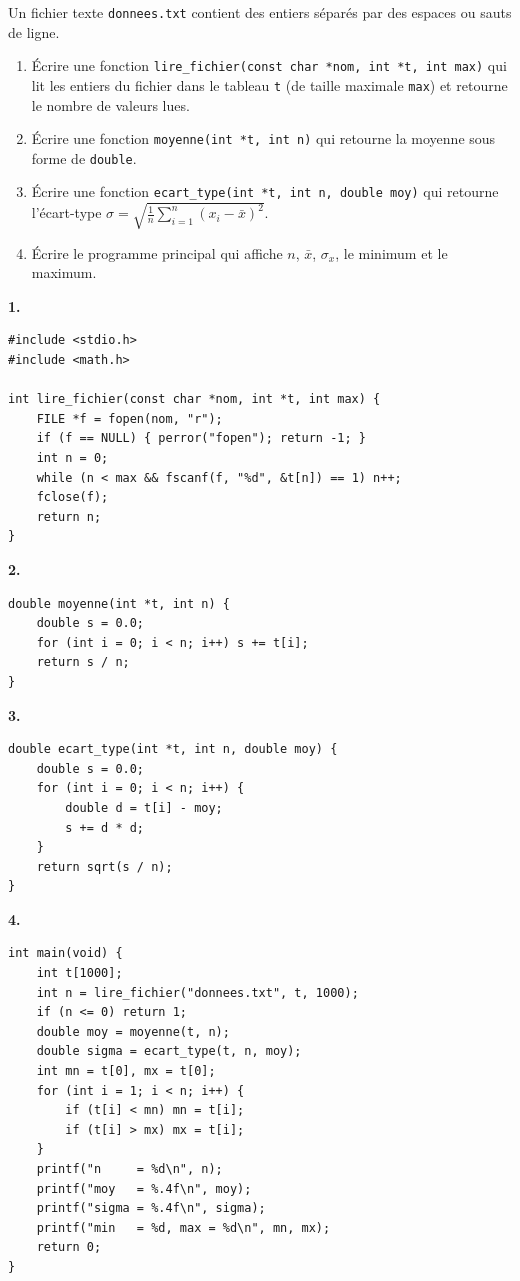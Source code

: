 \documentclass[12pt,a4paper]{article}
\begin{document}
\begin{boiteexercice}
Un fichier texte \texttt{donnees.txt} contient des entiers séparés par des espaces ou sauts de ligne.
\begin{enumerate}
  \item Écrire une fonction \texttt{lire\_fichier(const char *nom, int *t, int max)} qui lit les entiers du fichier dans le tableau \texttt{t} (de taille maximale \texttt{max}) et retourne le nombre de valeurs lues.
  \item Écrire une fonction \texttt{moyenne(int *t, int n)} qui retourne la moyenne sous forme de \texttt{double}.
  \item Écrire une fonction \texttt{ecart\_type(int *t, int n, double moy)} qui retourne l'écart-type $\sigma = \sqrt{\frac{1}{n}\sum_{i=1}^n(x_i-\bar x)^2}$.
  \item Écrire le programme principal qui affiche $n$, $\bar x$, $\sigma_x$, le minimum et le maximum.
\end{enumerate}
\end{boiteexercice}

\begin{boitecorrige}
\textbf{1.}
\begin{lstlisting}
#include <stdio.h>
#include <math.h>

int lire_fichier(const char *nom, int *t, int max) {
    FILE *f = fopen(nom, "r");
    if (f == NULL) { perror("fopen"); return -1; }
    int n = 0;
    while (n < max && fscanf(f, "%d", &t[n]) == 1) n++;
    fclose(f);
    return n;
}
\end{lstlisting}

\textbf{2.}
\begin{lstlisting}
double moyenne(int *t, int n) {
    double s = 0.0;
    for (int i = 0; i < n; i++) s += t[i];
    return s / n;
}
\end{lstlisting}

\textbf{3.}
\begin{lstlisting}
double ecart_type(int *t, int n, double moy) {
    double s = 0.0;
    for (int i = 0; i < n; i++) {
        double d = t[i] - moy;
        s += d * d;
    }
    return sqrt(s / n);
}
\end{lstlisting}

\textbf{4.}
\begin{lstlisting}
int main(void) {
    int t[1000];
    int n = lire_fichier("donnees.txt", t, 1000);
    if (n <= 0) return 1;
    double moy = moyenne(t, n);
    double sigma = ecart_type(t, n, moy);
    int mn = t[0], mx = t[0];
    for (int i = 1; i < n; i++) {
        if (t[i] < mn) mn = t[i];
        if (t[i] > mx) mx = t[i];
    }
    printf("n     = %d\n", n);
    printf("moy   = %.4f\n", moy);
    printf("sigma = %.4f\n", sigma);
    printf("min   = %d, max = %d\n", mn, mx);
    return 0;
}
\end{lstlisting}
\end{boitecorrige}
\end{document}
